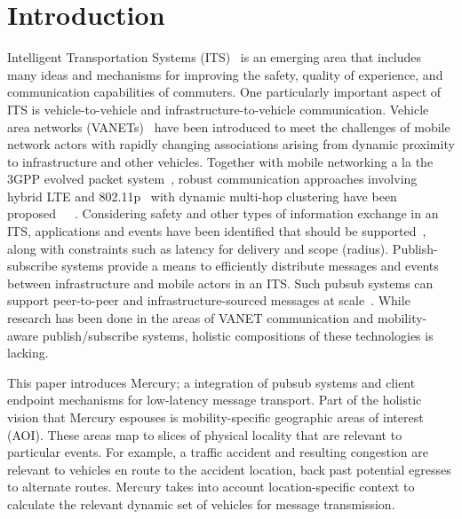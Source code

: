\section{Introduction}

Intelligent Transportation Systems (ITS)~\cite{zhang2011data} is an emerging
area that includes many ideas and mechanisms for improving the safety,
quality of experience, and communication capabilities of
commuters. One particularly important aspect of ITS is
vehicle-to-vehicle and infrastructure-to-vehicle
communication. Vehicle area networks (VANETs)~\cite{VANET} have been
introduced to meet the challenges of mobile network actors with
rapidly changing associations arising from dynamic proximity to
infrastructure and other vehicles. Together with mobile networking a
la the 3GPP evolved packet system~\cite{3GPP}, robust communication
approaches involving hybrid LTE and 802.11p~\cite{802.11p} with
dynamic multi-hop clustering have been
proposed~\cite{ucar2016multihop}~\cite{wolny2008modified}~\cite{zhang2011novel}.
Considering safety and
other types of information exchange in an ITS, applications and events
have been identified that should be supported~\cite{vanet-apps}, along
with constraints such as latency for delivery and scope
(radius). Publish-subscribe systems provide a means to efficiently
distribute messages and events between infrastructure and mobile
actors in an ITS. Such pubsub systems can support peer-to-peer and
infrastructure-sourced messages at scale~\cite{nasim2014mobile}.  While
research has been done in the areas of VANET communication and
mobility-aware publish/subscribe systems, holistic compositions of
these technologies is lacking.

This paper introduces Mercury; a integration of pubsub systems and
client endpoint mechanisms for low-latency message transport.  Part of
the holistic vision that Mercury espouses is mobility-specific
geographic areas of interest (AOI). These areas map to slices of
physical locality that are relevant to particular events.  For
example, a traffic accident and resulting congestion are relevant to
vehicles en route to the accident location, back past potential
egresses to alternate routes.  Mercury takes into account
location-specific context to calculate the relevant dynamic set of
vehicles for message transmission.

